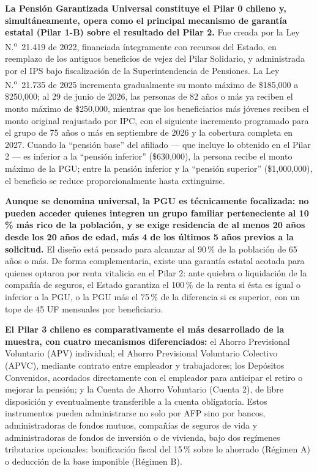 \documentclass[12pt, letterpaper]{article}
\begin{document}
\textbf{La Pensión Garantizada Universal constituye el Pilar 0 chileno y, simultáneamente, opera como el principal mecanismo de garantía estatal (Pilar 1-B) sobre el resultado del Pilar 2.} Fue creada por la Ley N.\textsuperscript{o}~21.419 de 2022, financiada íntegramente con recursos del Estado, en reemplazo de los antiguos beneficios de vejez del Pilar Solidario, y administrada por el IPS bajo fiscalización de la Superintendencia de Pensiones. La Ley N.\textsuperscript{o}~21.735 de 2025 incrementa gradualmente su monto máximo de \$185,000 a \$250,000; al 29 de junio de 2026, las personas de 82 años o más ya reciben el monto máximo de \$250,000, mientras que los beneficiarios más jóvenes reciben el monto original reajustado por IPC, con el siguiente incremento programado para el grupo de 75 años o más en septiembre de 2026 y la cobertura completa en 2027. Cuando la ``pensión base'' del afiliado --- que incluye lo obtenido en el Pilar 2 --- es inferior a la ``pensión inferior'' (\$630,000), la persona recibe el monto máximo de la PGU; entre la pensión inferior y la ``pensión superior'' (\$1,000,000), el beneficio se reduce proporcionalmente hasta extinguirse.

\textbf{Aunque se denomina universal, la PGU es técnicamente focalizada: no pueden acceder quienes integren un grupo familiar perteneciente al 10\,\% más rico de la población, y se exige residencia de al menos 20 años desde los 20 años de edad, más 4 de los últimos 5 años previos a la solicitud.} El diseño está pensado para alcanzar al 90\,\% de la población de 65 años o más. De forma complementaria, existe una garantía estatal acotada para quienes optaron por renta vitalicia en el Pilar 2: ante quiebra o liquidación de la compañía de seguros, el Estado garantiza el 100\,\% de la renta si ésta es igual o inferior a la PGU, o la PGU más el 75\,\% de la diferencia si es superior, con un tope de 45 UF mensuales por beneficiario.

\textbf{El Pilar 3 chileno es comparativamente el más desarrollado de la muestra, con cuatro mecanismos diferenciados:} el Ahorro Previsional Voluntario (APV) individual; el Ahorro Previsional Voluntario Colectivo (APVC), mediante contrato entre empleador y trabajadores; los Depósitos Convenidos, acordados directamente con el empleador para anticipar el retiro o mejorar la pensión; y la Cuenta de Ahorro Voluntario (Cuenta 2), de libre disposición y eventualmente transferible a la cuenta obligatoria. Estos instrumentos pueden administrarse no solo por AFP sino por bancos, administradoras de fondos mutuos, compañías de seguros de vida y administradoras de fondos de inversión o de vivienda, bajo dos regímenes tributarios opcionales: bonificación fiscal del 15\,\% sobre lo ahorrado (Régimen A) o deducción de la base imponible (Régimen B).
\end{document}
